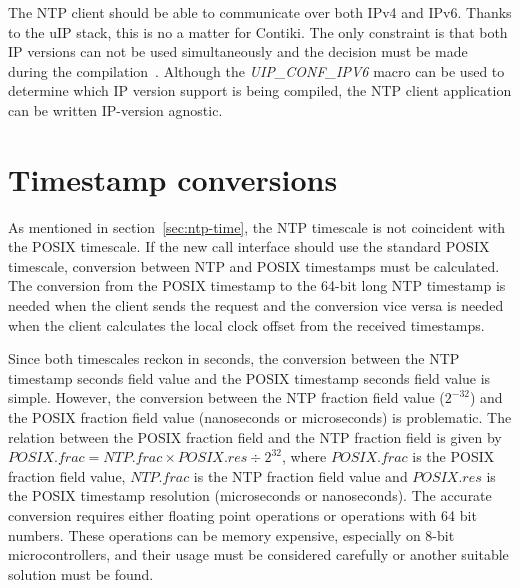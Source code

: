 The NTP client should be able to communicate over both IPv4 and IPv6.
Thanks to the uIP stack, this is no a matter for Contiki.
The only constraint is that both IP versions can not be used simultaneously
and the decision must be made during the compilation~\cite{contiki-docs}.
Although the {\it{UIP\_CONF\_IPV6}} macro can be used to determine which IP version
support is being compiled, the NTP client application can be written IP-version agnostic.


\section{Timestamp conversions}
As mentioned in section~\ref{sec:ntp-time}, the NTP timescale is not
coincident with the POSIX timescale.
If the new call interface should use the standard POSIX timescale,
conversion between NTP and POSIX timestamps must be calculated.
The conversion from the POSIX timestamp to the 64-bit long NTP timestamp
is needed when the client sends the request
and the conversion vice versa is needed when the client calculates
the local clock offset from the received timestamps.

Since both timescales reckon in seconds, the conversion between
the NTP timestamp seconds field value and the POSIX timestamp seconds field value is simple.
However, the conversion between the NTP fraction field value ($2^{-32}$)
and the POSIX fraction field value (nanoseconds or microseconds) is problematic.
The relation between the POSIX fraction field and the NTP fraction field
is given by $POSIX.frac = NTP.frac \times POSIX.res \div 2^{32}$,
where $POSIX.frac$ is the POSIX fraction field value,
$NTP.frac$ is the NTP fraction field value and
$POSIX.res$ is the POSIX timestamp resolution (microseconds or nanoseconds).
The accurate conversion requires either floating point operations or operations with 64 bit numbers.
These operations can be memory expensive, especially on 8-bit microcontrollers,
and their usage must be considered carefully or another suitable solution must be found.







